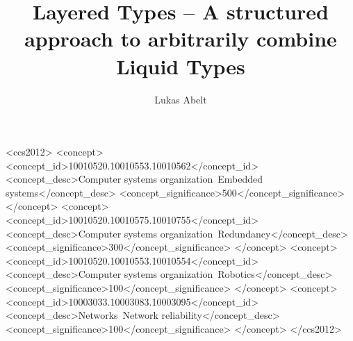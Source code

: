 \documentclass[acmsmall, review, screen]{acmart}
\begin{document}
\title[Layered Types]{Layered Types -- A structured approach to arbitrarily combine Liquid Types}

\author{Lukas Abelt}


\begin{abstract}
\end{abstract}

\begin{CCSXML}
<ccs2012>
 <concept>
  <concept_id>10010520.10010553.10010562</concept_id>
  <concept_desc>Computer systems organization~Embedded systems</concept_desc>
  <concept_significance>500</concept_significance>
 </concept>
 <concept>
  <concept_id>10010520.10010575.10010755</concept_id>
  <concept_desc>Computer systems organization~Redundancy</concept_desc>
  <concept_significance>300</concept_significance>
 </concept>
 <concept>
  <concept_id>10010520.10010553.10010554</concept_id>
  <concept_desc>Computer systems organization~Robotics</concept_desc>
  <concept_significance>100</concept_significance>
 </concept>
 <concept>
  <concept_id>10003033.10003083.10003095</concept_id>
  <concept_desc>Networks~Network reliability</concept_desc>
  <concept_significance>100</concept_significance>
 </concept>
</ccs2012>
\end{CCSXML}
\end{document}
